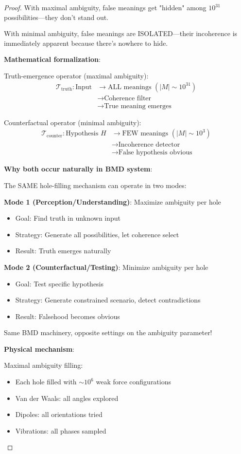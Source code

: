 \documentclass[11pt,a4paper]{article}
\begin{document}
\begin{proof}
With maximal ambiguity, false meanings get "hidden" among $10^{31}$ possibilities—they don't stand out.

With minimal ambiguity, false meanings are ISOLATED—their incoherence is immediately apparent because there's nowhere to hide.

\textbf{Mathematical formalization}:

Truth-emergence operator (maximal ambiguity):
\begin{align}
\mathcal{T}_{\text{truth}}: \text{Input} &\to \text{ALL meanings } (|M| \sim 10^{31}) \\
&\to \text{Coherence filter} \\
&\to \text{True meaning emerges}
\end{align}

Counterfactual operator (minimal ambiguity):
\begin{align}
\mathcal{T}_{\text{counter}}: \text{Hypothesis } H &\to \text{FEW meanings } (|M| \sim 10^3) \\
&\to \text{Incoherence detector} \\
&\to \text{False hypothesis obvious}
\end{align}

\textbf{Why both occur naturally in BMD system}:

The SAME hole-filling mechanism can operate in two modes:

\textbf{Mode 1 (Perception/Understanding)}: Maximize ambiguity per hole
\begin{itemize}
\item Goal: Find truth in unknown input
\item Strategy: Generate all possibilities, let coherence select
\item Result: Truth emerges naturally
\end{itemize}

\textbf{Mode 2 (Counterfactual/Testing)}: Minimize ambiguity per hole
\begin{itemize}
\item Goal: Test specific hypothesis
\item Strategy: Generate constrained scenario, detect contradictions
\item Result: Falsehood becomes obvious
\end{itemize}

Same BMD machinery, opposite settings on the ambiguity parameter!

\textbf{Physical mechanism}:

Maximal ambiguity filling:
\begin{itemize}
\item Each hole filled with $\sim 10^6$ weak force configurations
\item Van der Waals: all angles explored
\item Dipoles: all orientations tried
\item Vibrations: all phases sampled
\end{itemize}


\end{proof}
\end{document}
